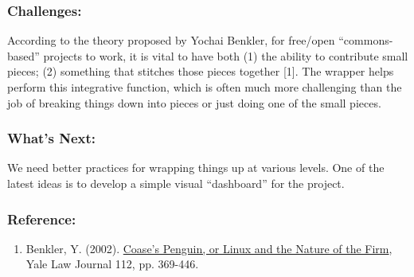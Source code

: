 \subsubsection*{Challenges:} According to the theory proposed by Yochai Benkler,
for free/open ``commons-based'' projects to work, it is vital to have
both (1) the ability to contribute small pieces; (2) something that
stitches those pieces together {[}1{]}. The wrapper helps perform this
integrative function, which is often much more challenging than the job
of breaking things down into pieces or just doing one of the small
pieces.

\subsubsection*{What's Next:}
We need better practices for wrapping things up at
various levels.  One of the latest ideas is to develop a simple visual
``dashboard'' for the project.

\subsubsection*{Reference:}

\begin{enumerate}
\itemsep1pt\parskip0pt
\item
  Benkler, Y.
  (2002). \href{http://www.yale.edu/yalelj/112/BenklerWEB.pdf}{Coase's
  Penguin, or Linux and the Nature of the Firm}, Yale Law Journal 112,
  pp. 369-446.
\end{enumerate}
